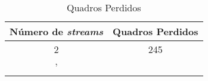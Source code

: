 
\begin{table}[H]
    \centering
    \caption{Quadros Perdidos}
    \label{tab:results:dropped_frames_table}
    \begin{tabular}{|c|c|}
    \toprule
    Número de \textit{streams} & Quadros Perdidos \\
    \midrule
    2 & 245 \\'
    \bottomrule
    \end{tabular}
\end{table}
